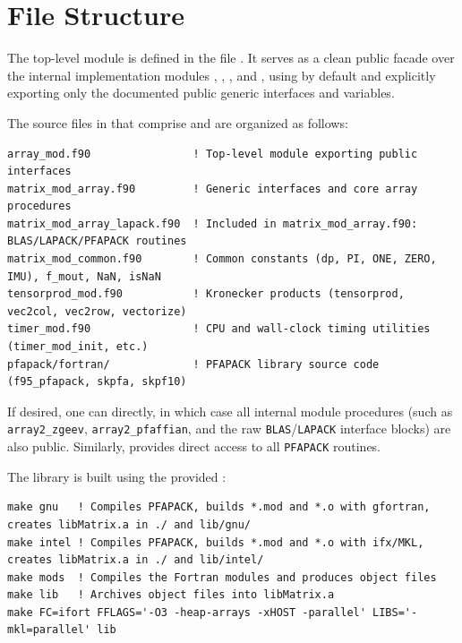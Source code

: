 \section{File Structure}
\label{sec:file_structure}

The top-level module  is defined in the file . It serves as a clean public facade over the internal implementation modules , , , and , using  by default and explicitly exporting only the documented public generic interfaces and variables.

The source files in  that comprise  and  are organized as follows:
\lstset{language=[95]Fortran}
\begin{lstlisting}
array_mod.f90                ! Top-level module exporting public interfaces
matrix_mod_array.f90         ! Generic interfaces and core array procedures
matrix_mod_array_lapack.f90  ! Included in matrix_mod_array.f90: BLAS/LAPACK/PFAPACK routines
matrix_mod_common.f90        ! Common constants (dp, PI, ONE, ZERO, IMU), f_mout, NaN, isNaN
tensorprod_mod.f90           ! Kronecker products (tensorprod, vec2col, vec2row, vectorize)
timer_mod.f90                ! CPU and wall-clock timing utilities (timer_mod_init, etc.)
pfapack/fortran/             ! PFAPACK library source code (f95_pfapack, skpfa, skpf10)
\end{lstlisting}

If desired, one can  directly, in which case all internal module procedures (such as \texttt{array2\_zgeev}, \texttt{array2\_pfaffian}, and the raw \texttt{BLAS}/\texttt{LAPACK} interface blocks) are also public. Similarly,  provides direct access to all \texttt{PFAPACK} routines.

The library is built using the provided :
\lstset{language=bash}
\begin{lstlisting}
make gnu   ! Compiles PFAPACK, builds *.mod and *.o with gfortran, creates libMatrix.a in ./ and lib/gnu/
make intel ! Compiles PFAPACK, builds *.mod and *.o with ifx/MKL, creates libMatrix.a in ./ and lib/intel/
make mods  ! Compiles the Fortran modules and produces object files
make lib   ! Archives object files into libMatrix.a
make FC=ifort FFLAGS='-O3 -heap-arrays -xHOST -parallel' LIBS='-mkl=parallel' lib
\end{lstlisting}

